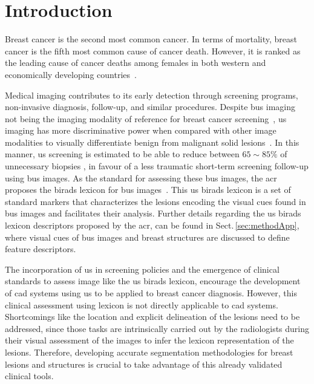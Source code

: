 \graphicspath{ {./content/intro/figures/} }

\section{Introduction}
\label{sec:intro}  %


Breast cancer is the second most common cancer.
In terms of mortality, breast cancer is the fifth most common cause of cancer death.
However, it is ranked as the leading cause of cancer deaths among females in both western and economically developing countries~\cite{cancerStatistics2011}.

Medical imaging contributes to its early detection through screening programs, non-invasive diagnosis, follow-up, and similar procedures.
Despite \ac{bus} imaging not being the imaging modality of reference for breast cancer screening~\cite{smith2003american}, \ac{us} imaging has more discriminative power when compared with other image modalities to visually differentiate benign from malignant solid lesions~\cite{Stavros:1995p12392}.
In this manner, \ac{us} screening is estimated to be able to reduce
between $65\sim85\%$ of unnecessary biopsies%
, in favour of a less traumatic short-term screening follow-up using \ac{bus} images.
As the standard for assessing these \ac{bus} images, the \ac{acr} proposes the \ac{birads} lexicon for \ac{bus} images~\cite{biradsus}.
This \ac{us} \ac{birads} lexicon is a set of standard markers that characterizes the lesions encoding the visual cues found in \ac{bus} images and facilitates their analysis.
Further details regarding the \ac{us} \ac{birads} lexicon descriptors proposed by the \ac{acr}, can be found in Sect.\,\ref{sec:methodApp}, where visual cues of \ac{bus} images and breast structures are discussed to define feature descriptors.

The incorporation of \ac{us} in screening policies and the emergence of clinical standards to assess image like the \ac{us} \ac{birads} lexicon, encourage the development of \ac{cad} systems using \ac{us} to be applied to breast cancer diagnosis.
However, this clinical assessment using lexicon is not directly applicable to \ac{cad} systems.
Shortcomings like the location and explicit delineation of the lesions need to be addressed, since those tasks are intrinsically carried out by the radiologists during their visual assessment of the images to infer the lexicon representation of the lesions.
Therefore, developing accurate segmentation methodologies for breast lesions and structures is crucial to take advantage of this already validated clinical tools.

